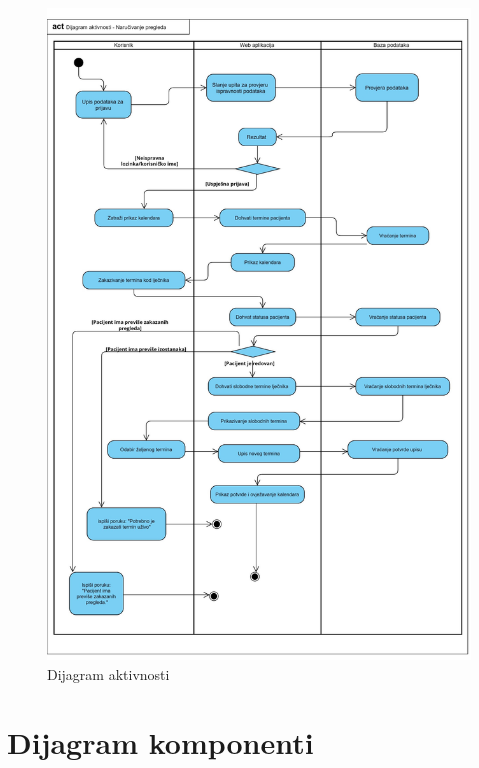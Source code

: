 			 \begin{figure}[H]
			            \includegraphics[width=\textwidth]{slike/dijagram_aktivnosti.jpg} %
			          \caption{Dijagram aktivnosti}
			            \label{fig:act} %
		      \end{figure}
			
			\eject
		\section{Dijagram komponenti}
		
		
			 
